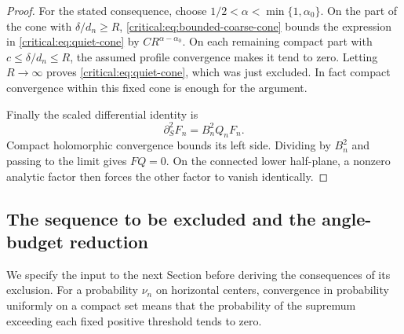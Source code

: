\begin{proof}
For the stated consequence, choose
\(1/2<\alpha<\min\{1,\alpha_0\}\). On the part of the cone with
\(\delta/d_n\ge R\), \eqref{critical:eq:bounded-coarse-cone}
bounds the expression in \eqref{critical:eq:quiet-cone} by
\(C R^{\alpha-\alpha_0}\). On each remaining compact part with
\(c\le\delta/d_n\le R\), the assumed profile convergence makes
it tend to zero. Letting \(R\to\infty\) proves
\eqref{critical:eq:quiet-cone}, which was just excluded. In fact
compact convergence within this fixed cone is enough for the argument.

Finally the scaled differential identity is
\[
 \partial_S^2F_n=B_n^2Q_nF_n.
\]
Compact holomorphic convergence bounds its left side. Dividing by
\(B_n^2\) and passing to the limit gives \(FQ=0\). On the
connected lower half-plane, a nonzero analytic factor then forces
the other factor to vanish identically.
\end{proof}

\subsection{The sequence to be excluded and the angle-budget reduction}

We specify the input to the next Section before deriving the
consequences of its exclusion. For a probability \(\nu_n\) on
horizontal centers, convergence in probability uniformly on a compact
set means that the probability of the supremum exceeding each fixed
positive threshold tends to zero.

